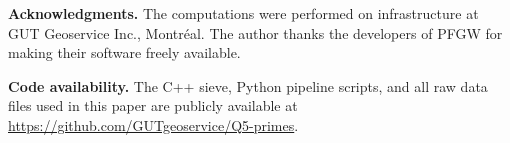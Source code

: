\documentclass[11pt,a4paper]{article}
\theoremstyle{plain}
\theoremstyle{definition}
\theoremstyle{remark}
\begin{document}

\medskip
\noindent\textbf{Acknowledgments.}
The computations were performed on infrastructure at GUT Geoservice Inc., Montr\'eal. The author thanks the developers of PFGW for making their software freely available.

\medskip
\noindent\textbf{Code availability.}
The C++ sieve, Python pipeline scripts, and all raw data files used in this paper are publicly available at \url{https://github.com/GUTgeoservice/Q5-primes}.

\end{document}
